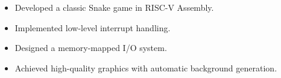 \begin{multicols}{2}
    \begin{itemize}
        \item Developed a classic Snake game in RISC-V Assembly.
        \item Implemented low-level interrupt handling.
        \item Designed a memory-mapped I/O system.
        \item Achieved high-quality graphics with automatic background generation.
    \end{itemize}
\end{multicols}
